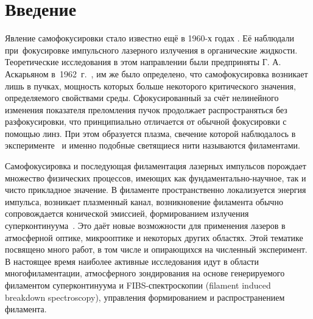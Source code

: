 \cleardoublepage
{}
\section*{Введение}


\renewcommand{\theequation}{В.\arabic{equation}}


Явление самофокусировки стало известно ещё в 1960-х годах \cite{BespalovTalanov1966}. Её наблюдали при~фокусировке
импульсного лазерного излучения в органические жидкости. Теоретические исследования в этом направлении
были предприняты Г. А. Аскарьяном в~1962~г.~\cite{Askaryan1962}, им же было определено, что
самофокусировка возникает лишь в пучках, мощность которых больше некоторого критического
значения, определяемого свойствами среды. Сфокусированный за счёт нелинейного изменения показателя преломления
пучок продолжает распространяться без разфокусировки, что принципиально отличается от обычной
фокусировки с помощью линз. При этом образуется плазма, свечение которой наблюдалось
в эксперименте~\cite{PilipetskiyRustamov1965} и именно подобные светящиеся нити называются филаментами.


Самофокусировка и последующая филаментация лазерных импульсов порождает множество
физических процессов, имеющих как фундаментально-научное, так и чисто прикладное значение. В филаменте
пространственно локализуется энергия импульса, возникает плазменный канал, возникновение
филамента обычно сопровождается конической эмиссией, формированием излучения
суперконтинуума~\cite{KandidovShlenovKosarevaReview2009}. Это даёт новые возможности
для применения лазеров в атмосферной оптике, микрооптике и некоторых других областях.
Этой тематике посвящено много работ, в том числе и опирающихся на численный эксперимент.
В настоящее время наиболее активные исследования идут в области многофиламентации,
атмосферного зондирования на основе генерируемого филаментом суперконтинуума и FIBS-спектроскопии
(filament induced breakdown spectroscopy), управления формированием и распространением филамента.


